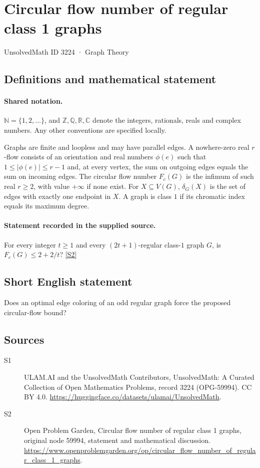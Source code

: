 \documentclass[11pt]{article}
\newcommand{\sref}[2]{\hyperlink{source:#1:#2}{[S#2]}}
\begin{document}
\setcounter{section}{3223}
\section{Circular flow number of regular class 1 graphs}\label{3224}
{\small\sffamily UnsolvedMath ID 3224 · Graph Theory}
\subsection{Definitions and mathematical statement}

\paragraph{Shared notation.}$\mathbb N=\{1,2,\ldots\}$, and $\mathbb Z,\mathbb Q,\mathbb R,\mathbb C$ denote the integers, rationals, reals and complex numbers. Any other conventions are specified locally.


Graphs are finite and loopless and may have parallel edges. A nowhere-zero real $r$-flow consists of an orientation and real numbers $\phi(e)$ such that $1\le|\phi(e)|\le r-1$ and, at every vertex, the sum on outgoing edges equals the sum on incoming edges. The circular flow number $F_c(G)$ is the infimum of such real $r\ge2$, with value $+\infty$ if none exist. For $X\subseteq V(G)$, $\delta_G(X)$ is the set of edges with exactly one endpoint in $X$. A graph is class $1$ if its chromatic index equals its maximum degree.
\paragraph{Statement recorded in the supplied source.}
For every integer $t\ge1$ and every $(2t+1)$-regular class-$1$ graph $G$, is $F_c(G)\le2+2/t$? \sref{3224}{2}
\subsection{Short English statement}
Does an optimal edge coloring of an odd regular graph force the proposed circular-flow bound?
\subsection{Sources}
\begin{description}
\item[\hypertarget{source:3224:1}{S1}] ULAM.AI and the UnsolvedMath Contributors, UnsolvedMath: A Curated Collection of Open Mathematics Problems, record 3224 (OPG-59994). CC BY 4.0. \url{https://huggingface.co/datasets/ulamai/UnsolvedMath}.
\item[\hypertarget{source:3224:2}{S2}] Open Problem Garden, Circular flow number of regular class 1 graphs, original node 59994, statement and mathematical discussion. \url{https://www.openproblemgarden.org/op/circular_flow_number_of_regular_class_1_graphs}.
\end{description}
\label{end:3224}
\end{document}
